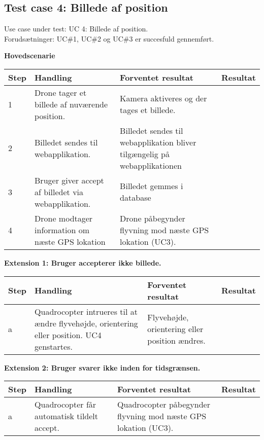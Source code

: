 \newpage

\subsection*{Test case 4: Billede af position}
Use case under test: UC 4: Billede af position.\\
Forudsætninger:	UC\#1, UC\#2 og UC\#3 er succesfuld gennemført.

\textbf{Hovedscenarie}
\begin{table}[H]
	\centering
		\begin{tabular}{|l|p{5 cm}|p{5 cm}|p{3.5 cm}|} 
		\hline
			Step & Handling & Forventet resultat & Resultat\\ \hline
			1 & Drone tager et billede af nuværende position. & Kamera aktiveres og der tages et billede. & \\ \hline
			2 & Billedet sendes til webapplikation. & Billedet sendes til webapplikation bliver tilgængelig på webapplikationen &  \\ \hline
			3 & Bruger giver accept af billedet via webapplikation. & Billedet gemmes i database  & \\ \hline
			4 & Drone modtager information om næste GPS lokation & Drone påbegynder flyvning mod næste GPS lokation (UC3). & \\ \hline

		\end{tabular}
\end{table}


\textbf{Extension 1: Bruger accepterer ikke billede.}
\begin{table}[H]
	\centering
		\begin{tabular}{|l|p{5 cm}|p{5 cm}|p{3.5 cm}|} 
		\hline
			Step & Handling & Forventet resultat & Resultat\\ \hline
			a & Quadrocopter intrueres til at ændre flyvehøjde, orientering eller position. UC4 genstartes. & Flyvehøjde, orientering eller position ændres. & \\ \hline
		\end{tabular}
\end{table}

\textbf{Extension 2: Bruger svarer ikke inden for tidsgrænsen.}
\begin{table}[H]
	\centering
		\begin{tabular}{|l|p{5 cm}|p{5 cm}|p{3.5 cm}|} 
		\hline
			Step & Handling & Forventet resultat & Resultat\\ \hline
			a & Quadrocopter får automatisk tildelt accept. & Quadrocopter påbegynder flyvning mod næste GPS lokation (UC3). & \\ \hline
		\end{tabular}
\end{table}

